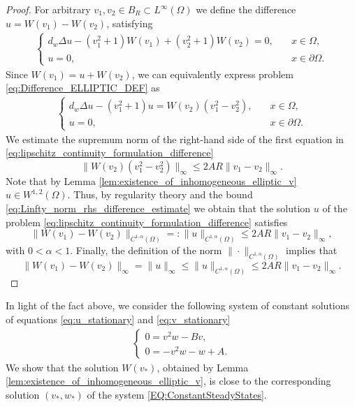 \documentclass[11pt, a4paper]{article}
\theoremstyle{break}
\theoremstyle{break}
\theoremstyle{break}
\theoremstyle{break}
\theoremstyle{break}
\theoremstyle{break}
\theoremstyle{break}
\theoremstyle{break}
\theoremstyle{break}
\theoremstyle{break}
\begin{document}
\begin{proof}
    For arbitrary $v_1, v_2 \in B_R \subset L^\infty(\Omega)$ we define the difference $u = W(v_1) - W(v_2)$, satisfying 
    \begin{align}
        \label{eq:Difference_ELLIPTIC_DEF}
        \begin{cases}
            d_w\Delta u - (v_1^2 + 1) W(v_1) + (v_2^2 + 1) W(v_2) = 0, &\quad x \in \Omega, \\
            u = 0, &\quad x \in \partial\Omega.
        \end{cases}
    \end{align}
    Since $W(v_1) = u + W(v_2)$, we can equivalently express problem \eqref{eq:Difference_ELLIPTIC_DEF} as
    \begin{align}
        \label{eq:lipschitz_continuity_formulation_difference}
        \begin{cases}
            d_w\Delta u - (v_1^2 + 1) u  = W(v_2) (v_1^2 - v_2^2), &\quad x \in \Omega, \\
            u = 0, &\quad x \in \partial\Omega.
        \end{cases}
    \end{align}
    We estimate the supremum norm of the right-hand side of the first equation in \eqref{eq:lipschitz_continuity_formulation_difference}
    \begin{equation}
        \label{eq:Linfty_norm_rhs_difference_estimate}
        \|W(v_2) (v_1^2-v_2^2)\|_\infty \leq 2AR\|v_1-v_2\|_\infty.
    \end{equation}
    Note that by Lemma \ref{lem:existence_of_inhomogeneous_elliptic_v} $u \in W^{1,2}(\Omega)$. Thus, by regularity theory \cite[Theorems 8.33 and 8.34]{gilbarg2001elliptic} and the bound \eqref{eq:Linfty_norm_rhs_difference_estimate} we obtain that the solution $u$ of the problem \eqref{eq:lipschitz_continuity_formulation_difference} satisfies
    \begin{equation}
        \|W(v_1) - W(v_2)\|_{C^{1, \alpha}(\Omega)} =: \|u\|_{C^{1, \alpha}(\Omega)}  \leq 2AR\|v_1-v_2\|_\infty,
    \end{equation}
    with $0 < \alpha < 1$. Finally, the definition of the norm $\|\cdot\|_{C^{1,\alpha}(\Omega)}$ implies that 
    \begin{equation}
        \|W(v_1) - W(v_2)\|_\infty = \|u\|_\infty \leq \|u\|_{C^{1, \alpha}(\Omega)}  \leq 2AR\|v_1-v_2\|_\infty.
    \end{equation}
\end{proof}
In light of the fact above, we consider the following system of constant solutions of equations \eqref{eq:u_stationary} and \eqref{eq:v_stationary}
\begin{align}
    \label{EQ:ConstantSteadyStates}
    \begin{cases}
        0 = v^2w - Bv,\\
        0 = -v^2w - w + A.
    \end{cases}
\end{align}
We show that the solution $W(v_*)$, obtained by Lemma \ref{lem:existence_of_inhomogeneous_elliptic_v}, is close to the corresponding solution $(v_*, w_*)$ of the system \eqref{EQ:ConstantSteadyStates}. 
\end{document}
